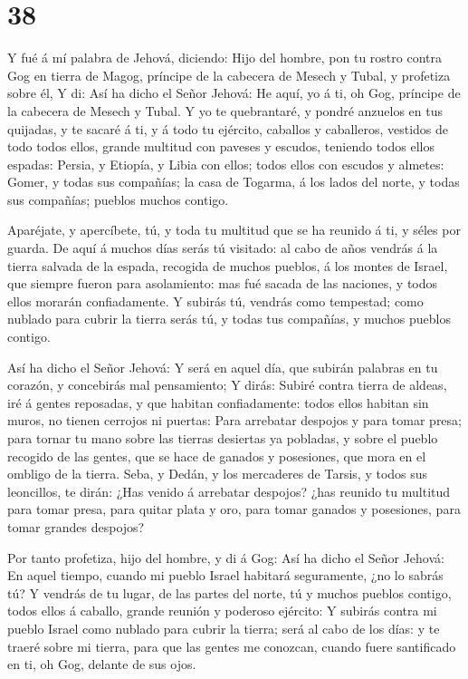 \hypertarget{section-37}{%
\section{38}\label{section-37}}

 Y fué á mí palabra de Jehová, diciendo:  Hijo
del hombre, pon tu rostro contra Gog en tierra de Magog, príncipe de la
cabecera de Mesech y Tubal, y profetiza sobre él,  Y di: Así
ha dicho el Señor Jehová: He aquí, yo á ti, oh Gog, príncipe de la
cabecera de Mesech y Tubal.  Y yo te quebrantaré, y pondré
anzuelos en tus quijadas, y te sacaré á ti, y á todo tu ejército,
caballos y caballeros, vestidos de todo todos ellos, grande multitud con
paveses y escudos, teniendo todos ellos espadas:  Persia, y
Etiopía, y Libia con ellos; todos ellos con escudos y almetes:
 Gomer, y todas sus compañías; la casa de Togarma, á los
lados del norte, y todas sus compañías; pueblos muchos contigo.

 Aparéjate, y apercíbete, tú, y toda tu multitud que se ha
reunido á ti, y séles por guarda.  De aquí á muchos días
serás tú visitado: al cabo de años vendrás á la tierra salvada de la
espada, recogida de muchos pueblos, á los montes de Israel, que siempre
fueron para asolamiento: mas fué sacada de las naciones, y todos ellos
morarán confiadamente.  Y subirás tú, vendrás como
tempestad; como nublado para cubrir la tierra serás tú, y todas tus
compañías, y muchos pueblos contigo.

 Así ha dicho el Señor Jehová: Y será en aquel día, que
subirán palabras en tu corazón, y concebirás mal pensamiento;
 Y dirás: Subiré contra tierra de aldeas, iré á gentes
reposadas, y que habitan confiadamente: todos ellos habitan sin muros,
no tienen cerrojos ni puertas:  Para arrebatar despojos y
para tomar presa; para tornar tu mano sobre las tierras desiertas ya
pobladas, y sobre el pueblo recogido de las gentes, que se hace de
ganados y posesiones, que mora en el ombligo de la tierra. 
Seba, y Dedán, y los mercaderes de Tarsis, y todos sus leoncillos, te
dirán: ¿Has venido á arrebatar despojos? ¿has reunido tu multitud para
tomar presa, para quitar plata y oro, para tomar ganados y posesiones,
para tomar grandes despojos?

 Por tanto profetiza, hijo del hombre, y di á Gog: Así ha
dicho el Señor Jehová: En aquel tiempo, cuando mi pueblo Israel habitará
seguramente, ¿no lo sabrás tú?  Y vendrás de tu lugar, de
las partes del norte, tú y muchos pueblos contigo, todos ellos á
caballo, grande reunión y poderoso ejército:  Y subirás
contra mi pueblo Israel como nublado para cubrir la tierra; será al cabo
de los días: y te traeré sobre mi tierra, para que las gentes me
conozcan, cuando fuere santificado en ti, oh Gog, delante de sus ojos.

